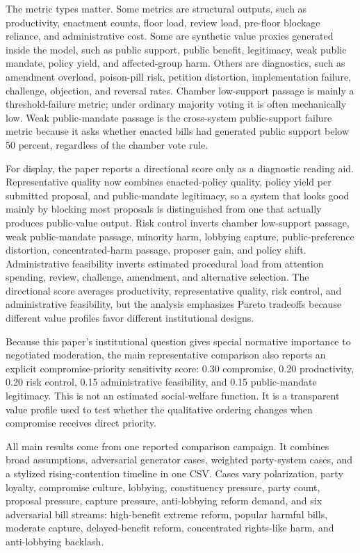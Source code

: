 \documentclass[manuscript,review,anonymous]{acmart}
\begin{document}
The metric types matter. Some metrics are structural outputs, such as productivity, enactment counts, floor load, review load, pre-floor blockage reliance, and administrative cost. Some are synthetic value proxies generated inside the model, such as public support, public benefit, legitimacy, weak public mandate, policy yield, and affected-group harm. Others are diagnostics, such as amendment overload, poison-pill risk, petition distortion, implementation failure, challenge, objection, and reversal rates. Chamber low-support passage is mainly a threshold-failure metric; under ordinary majority voting it is often mechanically low. Weak public-mandate passage is the cross-system public-support failure metric because it asks whether enacted bills had generated public support below 50 percent, regardless of the chamber vote rule.

For display, the paper reports a directional score only as a diagnostic reading aid. Representative quality now combines enacted-policy quality, policy yield per submitted proposal, and public-mandate legitimacy, so a system that looks good mainly by blocking most proposals is distinguished from one that actually produces public-value output. Risk control inverts chamber low-support passage, weak public-mandate passage, minority harm, lobbying capture, public-preference distortion, concentrated-harm passage, proposer gain, and policy shift. Administrative feasibility inverts estimated procedural load from attention spending, review, challenge, amendment, and alternative selection. The directional score averages productivity, representative quality, risk control, and administrative feasibility, but the analysis emphasizes Pareto tradeoffs because different value profiles favor different institutional designs.

Because this paper's institutional question gives special normative importance to negotiated moderation, the main representative comparison also reports an explicit compromise-priority sensitivity score: 0.30 compromise, 0.20 productivity, 0.20 risk control, 0.15 administrative feasibility, and 0.15 public-mandate legitimacy. This is not an estimated social-welfare function. It is a transparent value profile used to test whether the qualitative ordering changes when compromise receives direct priority.

All main results come from one reported comparison campaign. It combines broad assumptions, adversarial generator cases, weighted party-system cases, and a stylized rising-contention timeline in one CSV. Cases vary polarization, party loyalty, compromise culture, lobbying, constituency pressure, party count, proposal pressure, capture pressure, anti-lobbying reform demand, and six adversarial bill streams: high-benefit extreme reform, popular harmful bills, moderate capture, delayed-benefit reform, concentrated rights-like harm, and anti-lobbying backlash.
\end{document}
